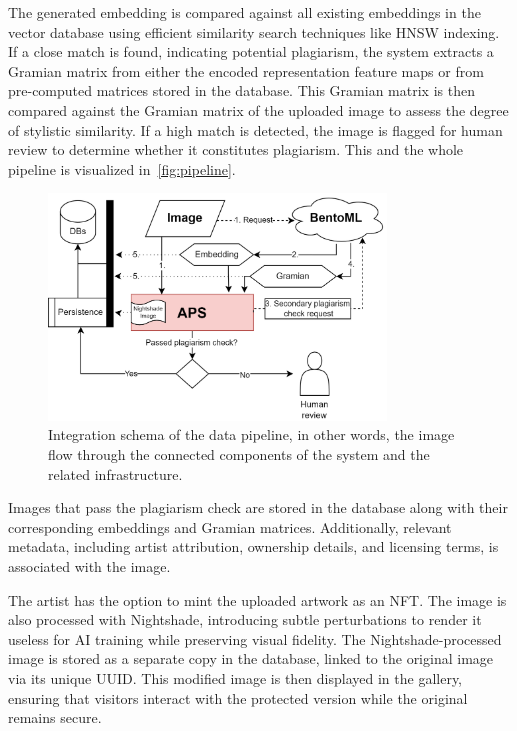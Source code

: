 The generated embedding is compared against all existing embeddings in the vector database using efficient similarity search techniques like HNSW indexing. If a close match is found, indicating potential plagiarism, the system extracts a Gramian matrix from either the encoded representation feature maps or from pre-computed matrices stored in the database. This Gramian matrix is then compared against the Gramian matrix of the uploaded image to assess the degree of stylistic similarity. If a high match is detected, the image is flagged for human review to determine whether it constitutes plagiarism. This and the whole pipeline is visualized in~\autoref{fig:pipeline}.

\begin{figure}[ht]
    \centering
    \includegraphics[width=0.8\textwidth]{figs/integ.png}
    \caption{Integration schema of the data pipeline, in other words, the image flow through the connected components of the system and the related infrastructure.}
    \label{fig:pipeline}
\end{figure}

Images that pass the plagiarism check are stored in the database along with their corresponding embeddings and Gramian matrices. Additionally, relevant metadata, including artist attribution, ownership details, and licensing terms, is associated with the image.

The artist has the option to mint the uploaded artwork as an NFT. The image is also processed with Nightshade, introducing subtle perturbations to render it useless for AI training while preserving visual fidelity. The Nightshade-processed image is stored as a separate copy in the database, linked to the original image via its unique UUID. This modified image is then displayed in the gallery, ensuring that visitors interact with the protected version while the original remains secure.

